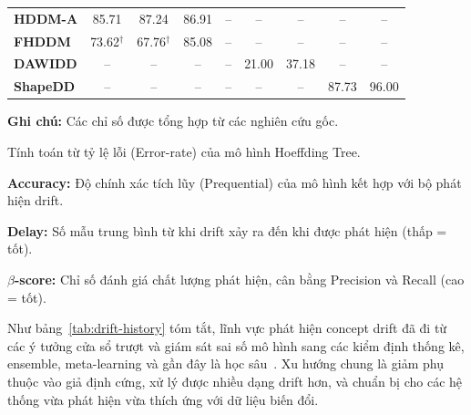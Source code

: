 \begin{table}[!htbp]
\begin{threeparttable}
\begin{tabular}{@{}lcccccccc@{}}
			\textbf{HDDM-A}                      & 85.71                                      & 87.24                              & 86.91                                      & --           & --             & --            & --             & --            \\
			\textbf{FHDDM}                       & 73.62$^{\dagger}$                          & 67.76$^{\dagger}$                  & 85.08                                      & --           & --             & --            & --             & --            \\
			\textbf{DAWIDD}                      & --                                         & --                                 & --                                         & --           & 21.00          & 37.18         & --             & --            \\
			\textbf{ShapeDD}                     & --                                         & --                                 & --                                         & --           & --             & --            & 87.73          & 96.00         \\
			\bottomrule
		\end{tabular}
		\begin{tablenotes}
			\footnotesize
			\item \textbf{Ghi chú:} Các chỉ số được tổng hợp từ các nghiên cứu gốc.
			\item[$\dagger$] Tính toán từ tỷ lệ lỗi (Error-rate) của mô hình Hoeffding Tree.
			\item \textbf{Accuracy:} Độ chính xác tích lũy (Prequential) của mô hình kết hợp với bộ phát hiện drift.
			\item \textbf{Delay:} Số mẫu trung bình từ khi drift xảy ra đến khi được phát hiện (thấp = tốt).
			\item \textbf{$\beta$-score:} Chỉ số đánh giá chất lượng phát hiện, cân bằng Precision và Recall (cao = tốt).
		\end{tablenotes}
	\end{threeparttable}
\end{table}

Như bảng~\ref{tab:drift-history} tóm tắt, lĩnh vực phát hiện concept drift đã đi từ các ý tưởng cửa sổ trượt và giám sát sai số mô hình sang các kiểm định thống kê, ensemble, meta-learning và gần đây là học sâu~\cite{hovakimyan2024evolving}. Xu hướng chung là giảm phụ thuộc vào giả định cứng, xử lý được nhiều dạng drift hơn, và chuẩn bị cho các hệ thống vừa phát hiện vừa thích ứng với dữ liệu biến đổi.

